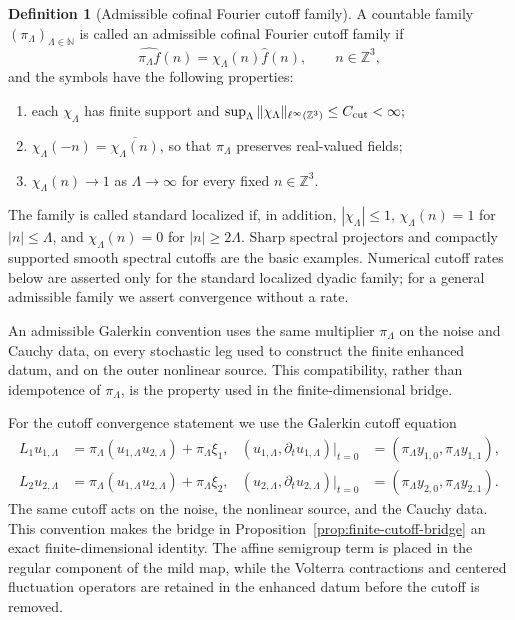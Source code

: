 \documentclass[10pt]{amsart}
\numberwithin{equation}{section}
\theoremstyle{plain}
\theoremstyle{definition}
\newtheorem{definition}[theorem]{Definition}
\theoremstyle{remark}
\begin{document}
\begin{definition}[Admissible cofinal Fourier cutoff family]\label{def:admissible-cutoff-family}
A countable family \((\pi_\Lambda)_{\Lambda\in\mathbb N}\) is called an admissible cofinal Fourier cutoff family if
\[
        \widehat{\pi_\Lambda f}(n)
        =\chi_\Lambda(n)\widehat f(n),
        \qquad n\in\mathbb Z^3,
\]
and the symbols have the following properties:
\begin{enumerate}[label=\textup{(\roman*)},leftmargin=2.2em]
\item each \(\chi_\Lambda\) has finite support and
\(
 \sup_{\Lambda}\|\chi_\Lambda\|_{\ell^\infty(\mathbb Z^3)}
 \le C_{\rm cut}<\infty;
\)
\item \(\chi_\Lambda(-n)=\overline{\chi_\Lambda(n)}\), so that \(\pi_\Lambda\) preserves real-valued fields;
\item \(\chi_\Lambda(n)\to1\) as \(\Lambda\to\infty\) for every fixed \(n\in\mathbb Z^3\).
\end{enumerate}
The family is called standard localized if, in addition, \(|\chi_\Lambda|\le1\), \(\chi_\Lambda(n)=1\) for \(|n|\le\Lambda\), and \(\chi_\Lambda(n)=0\) for \(|n|\ge2\Lambda\).  Sharp spectral projectors and compactly supported smooth spectral cutoffs are the basic examples.  Numerical cutoff rates below are asserted only for the standard localized dyadic family; for a general admissible family we assert convergence without a rate.

An admissible Galerkin convention uses the same multiplier \(\pi_\Lambda\) on the noise and Cauchy data, on every stochastic leg used to construct the finite enhanced datum, and on the outer nonlinear source.  This compatibility, rather than idempotence of \(\pi_\Lambda\), is the property used in the finite-dimensional bridge.
\end{definition}

For the cutoff convergence statement we use the Galerkin cutoff equation
\begin{equation}\label{eq:cutoff-system}
\begin{aligned}
L_1u_{1,\Lambda}&=\pi_\Lambda(u_{1,\Lambda}u_{2,\Lambda})+\pi_\Lambda\xi_1,
& (u_{1,\Lambda},\partial_tu_{1,\Lambda})|_{t=0}&=(\pi_\Lambda y_{1,0},\pi_\Lambda y_{1,1}),\\
L_2u_{2,\Lambda}&=\pi_\Lambda(u_{1,\Lambda}u_{2,\Lambda})+\pi_\Lambda\xi_2,
& (u_{2,\Lambda},\partial_tu_{2,\Lambda})|_{t=0}&=(\pi_\Lambda y_{2,0},\pi_\Lambda y_{2,1}).
\end{aligned}
\end{equation}
The same cutoff acts on the noise, the nonlinear source, and the Cauchy data.  This convention makes the bridge in Proposition~\ref{prop:finite-cutoff-bridge} an exact finite-dimensional identity.  The affine semigroup term is placed in the regular component of the mild map, while the Volterra contractions and centered fluctuation operators are retained in the enhanced datum before the cutoff is removed.
\end{document}
